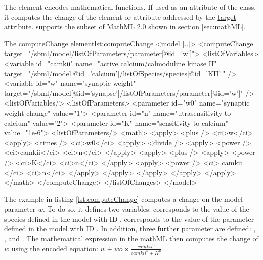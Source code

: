 The  element encodes mathematical functions. 
If used as an attribute of the  class, it computes the change of the element or attribute addressed by the \hyperref[sec:target]{target} attribute.
\LoneVone supports the subset of MathML 2.0 shown in section \ref{sec:mathML}.

%
\begin{myXmlLst}{The computeChange element}{lst:computeChange}
<model [..]>
    <computeChange target="/sbml/model/listOfParameters/parameter[@id='w']">
      <listOfVariables>
        <variable id="camkii" name="active calcium/calmoduline kinase II" 
                  target="/sbml/model[@id='calcium']/listOfSpecies/species[@id='KII']" />
        <variable id="w" name="synaptic weight"
                  target="/sbml/model[@id='synapse']/listOfParameters/parameter[@id='w']" />
      <listOfVariables/>
      <listOfParameters>
        <parameter id="w0" name="synaptic weight change" value="1">
        <parameter id="n" name="utrasensitivity to calcium" value="2">
        <parameter id="K" name="sensitivity to calcium" value="1e-6">
      <listOfParameters/>
      <math>
         <apply>
           <plus />
           <ci>w</ci>
           <apply>
             <times />
             <ci>w0</ci>
             <apply>
               <divide />
               <apply>
                 <power />
                 <ci>camkii</ci>
                 <ci>n</ci>
               </apply>
               <apply>
                 <plus />
                 <apply>
                   <power />
                   <ci>K</ci>
                   <ci>n</ci>
                 </apply>
                 <apply>
                   <power />
                   <ci> camkii </ci>
                   <ci>n</ci>
                 </apply>
               </apply>
             </apply>
           </apply> 
         </apply>
      </math>
    </computeChange>
  </listOfChanges>
</model>
\end{myXmlLst}
%

The example in listing \ref{lst:computeChange} computes a change on the model parameter $w$. To do so, it defines two variables.  corresponds to the value of the species  defined in the model with ID .  corresponds to the value of the parameter  defined in the model with ID . 
In addition, three further parameter are defined: , , and .
The mathematical expression in the mathML then computes the change of $w$ using the encoded equation:
\begin{math}

w + wo \times \frac{camkii^{n}}{camkii^{n}+K^{n}}

\end{math}



